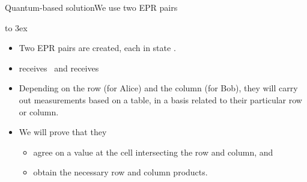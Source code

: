 \begin{frame}{Quantum-based solution}{We use two EPR pairs}

\Vskip{-4em}\begin{center}
%
\hbox to 3ex{\hss}%
\end{center}%

\begin{itemize}[<+->]
    \item Two EPR pairs are created, each in state .
    \item {} receives~ and  receives~
    \item Depending on the row (for Alice) and the column (for Bob), they will carry out measurements based on a table, in a basis related to their particular row or column.
    \item We will prove that they
    \begin{itemize}
        \item agree on a value at the cell intersecting the row and column, and
        \item obtain the necessary row and column products.
    \end{itemize}
\end{itemize}
    
\end{frame}


